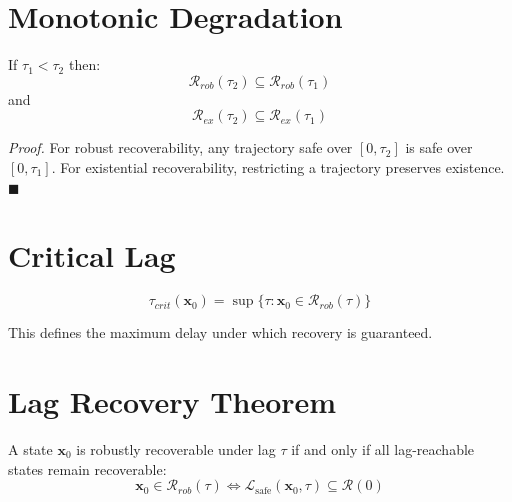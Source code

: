 \documentclass[letterpaper, 10 pt, conference]{ieeeconf}
\begin{document}
\section{Monotonic Degradation}

\begin{theorem}
If $\tau_1 < \tau_2$ then:
\begin{equation}
\mathcal{R}_{rob}(\tau_2) \subseteq \mathcal{R}_{rob}(\tau_1)
\end{equation}
and
\begin{equation}
\mathcal{R}_{ex}(\tau_2) \subseteq \mathcal{R}_{ex}(\tau_1)
\end{equation}
\end{theorem}

\textit{Proof.}
For robust recoverability, any trajectory safe over $[0,\tau_2]$ is safe over $[0,\tau_1]$. For existential recoverability, restricting a trajectory preserves existence. $\blacksquare$

\section{Critical Lag}

\begin{definition}
\begin{equation}
\tau_{crit}(\mathbf{x}_0) = \sup \{ \tau : \mathbf{x}_0 \in \mathcal{R}_{rob}(\tau) \}
\end{equation}
\end{definition}

This defines the maximum delay under which recovery is guaranteed.

\section{Lag Recovery Theorem}

\begin{theorem}
A state $\mathbf{x}_0$ is robustly recoverable under lag $\tau$ if and only if all lag-reachable states remain recoverable:
\begin{equation}
\mathbf{x}_0 \in \mathcal{R}_{rob}(\tau)
\iff
\mathcal{L}_{\text{safe}}(\mathbf{x}_0,\tau) \subseteq \mathcal{R}(0)
\end{equation}
\end{theorem}
\end{document}
